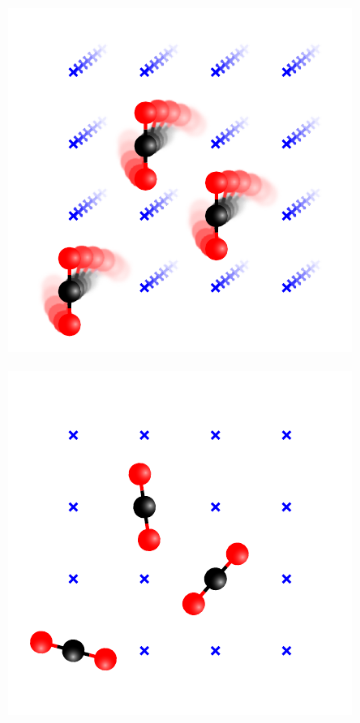 \documentclass[main.tex]{subfiles}
\begin{document}
\begin{figure}
	\centering
	\hfill\begin{subfigure}{0.33\linewidth}
		\centering
		\includegraphics[width=\linewidth]{figures/gcmc/gridMC_optionA.pdf}
	\end{subfigure}\hfill%
	\begin{subfigure}{0.33\linewidth}
		\centering
		\includegraphics[width=\linewidth]{figures/gcmc/gridMC_optionB.pdf}

\end{subfigure}
\end{figure}
\end{document}
